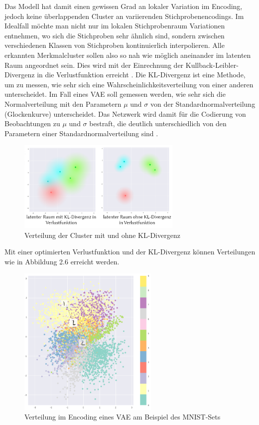 \FloatBarrier
Das Modell hat damit einen gewissen Grad an lokaler Variation im Encoding, jedoch keine überlappenden Cluster an variierenden Stichprobenencodings. Im Idealfall möchte man nicht nur im lokalen Stichprobenraum Variationen entnehmen, wo sich die Stichproben sehr ähnlich sind, sondern zwischen verschiedenen Klassen von Stichproben kontinuierlich interpolieren. Alle erkannten Merkmalcluster sollen also so nah wie möglich aneinander im latenten Raum angeordnet sein. Dies wird mit der Einrechnung der Kullback-Leibler-Divergenz in die Verlustfunktion erreicht \cite{sha18}. Die KL-Divergenz ist eine Methode, um zu messen, wie sehr sich eine Wahrscheinlichkeitsverteilung von einer anderen unterscheidet. Im Fall eines VAE soll gemessen werden, wie sehr sich die Normalverteilung mit den Parametern $\mu$ und $\sigma$ von der Standardnormalverteilung (Glockenkurve) unterscheidet. Das Netzwerk wird damit für die Codierung von Beobachtungen zu $\mu$ und $\sigma$ bestraft, die deutlich unterschiedlich von den Parametern einer Standardnormalverteilung sind \cite[S.102]{fos19}.
\begin{figure}[H]
    \centering
    \includegraphics[width=0.7\textwidth,angle=0]{abb/VAE_KLL}
    \caption[Verteilung der Cluster mit und ohne KL-Divergenz]{Verteilung der Cluster mit und ohne KL-Divergenz \cite{sha18}}
\end{figure}
Mit einer optimierten Verlustfunktion und der KL-Divergenz können Verteilungen wie in Abbildung 2.6 erreicht werden.
\begin{figure}[H]
    \centering
    \includegraphics[width=0.6\textwidth,angle=0]{abb/vae_final.png}
    \caption[Verteilung im Encoding eines VAE]{Verteilung im Encoding eines VAE am Beispiel des MNIST-Sets \cite{sha18}}
\end{figure}


